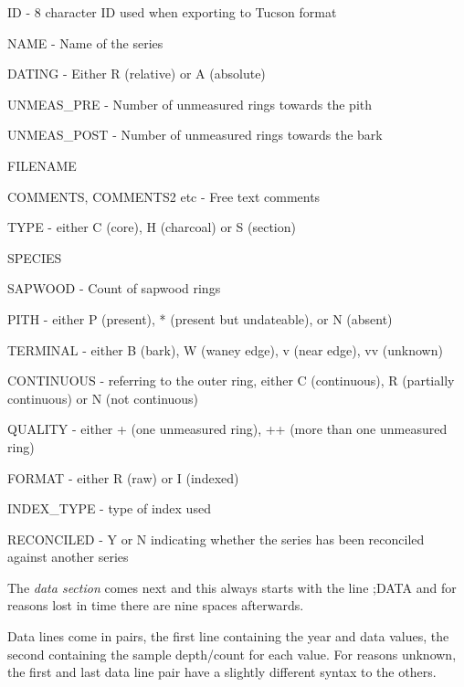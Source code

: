 \begin{itemize*}
 \item ID - 8 character ID used when exporting to Tucson format
\item  NAME - Name of the series
\item  DATING - Either R (relative) or A (absolute)
\item  UNMEAS\_PRE - Number of unmeasured rings towards the pith
\item  UNMEAS\_POST - Number of unmeasured rings towards the bark
\item  FILENAME
\item  COMMENTS, COMMENTS2 etc - Free text comments
\item  TYPE - either C (core), H (charcoal) or S (section)
\item  SPECIES
\item  SAPWOOD - Count of sapwood rings
\item  PITH - either P (present), * (present but undateable), or N (absent)
\item  TERMINAL - either B (bark), W (waney edge), v (near edge), vv (unknown)
\item  CONTINUOUS - referring to the outer ring, either C (continuous), R (partially continuous) or N (not continuous)
\item  QUALITY - either + (one unmeasured ring), ++ (more than one unmeasured ring)
\item  FORMAT - either R (raw) or I (indexed)
\item  INDEX\_TYPE - type of index used
\item  RECONCILED - Y or N indicating whether the series has been reconciled against another series 
\end{itemize*}

The \emph{data section} comes next and this always starts with the line ;DATA and for reasons lost in time there are nine spaces afterwards.

Data lines come in pairs, the first line containing the year and data values, the second containing the sample depth/count for each value. For reasons unknown, the first and last data line pair have a slightly different syntax to the others. 

